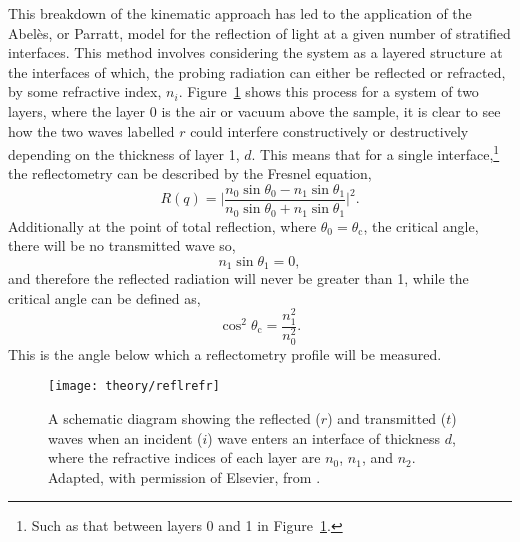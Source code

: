This breakdown of the kinematic approach has led to the application of the Abel\`{e}s, or Parratt, model for the reflection of light at a given number of stratified interfaces.\autocite[also known as dynamical theory]{abeles_sur_1948,parratt_surface_1954}
This method involves considering the system as a layered structure at the interfaces of which, the probing radiation can either be reflected or refracted, by some refractive index, $n_i$.
Figure~\ref{fig:reflrefr} shows this process for a system of two layers, where the layer \num{0} is the air or vacuum above the sample, it is clear to see how the two waves labelled $r$ could interfere constructively or destructively depending on the thickness of layer \num{1}, $d$.
This means that for a single interface,\footnote{Such as that between layers \num{0} and \num{1} in Figure~\ref{fig:reflrefr}.} the reflectometry can be described by the Fresnel equation,
%
\begin{equation}
    R(q) = \bigg| \frac{n_0\sin{\theta_0} - n_1\sin{\theta_1}}{n_0\sin{\theta_0} + n_1\sin{\theta_1}} \bigg|^2.
\end{equation}
%
Additionally at the point of total reflection, where $\theta_0 = \theta_{\text{c}}$, the critical angle, there will be no transmitted wave so,
%
\begin{equation}
    n_1\sin{\theta_1} = 0,
\end{equation}
%
and therefore the reflected radiation will never be greater than 1, while the critical angle can be defined as,
%
\begin{equation}
    \cos^2{\theta_{\text{c}}} = \frac{n_1^2}{n_0^2}.
\end{equation}
%
This is the angle below which a reflectometry profile will be measured.
%
\begin{figure}
    \centering
    \texttt{[image: theory/reflrefr]}
    \caption{A schematic diagram showing the reflected ($r$) and transmitted ($t$) waves when an incident ($i$) wave enters an interface of thickness $d$, where the refractive indices of each layer are $n_0$, $n_1$, and $n_2$. Adapted, with permission of Elsevier, from \cite{foglia_studies_2015}.}
    \label{fig:reflrefr}
\end{figure}
%

